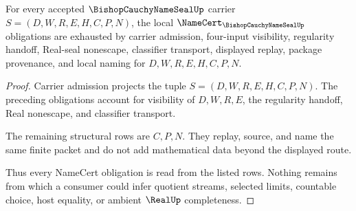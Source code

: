 \begin{theorem}
\label{thm:bishop-cauchy-name-seal-provenance-exhaustion}
For every accepted $\BishopCauchyNameSealUp$ carrier $S=(D,W,R,E,H,C,P,N)$, the local $\NameCert_{\BishopCauchyNameSealUp}$ obligations are exhausted by carrier admission, four-input visibility, regularity handoff, Real-seal nonescape, classifier transport, displayed replay, package provenance, and local naming for $D,W,R,E,H,C,P,N$.
\end{theorem}
\begin{proof}
Carrier admission projects the tuple $S=(D,W,R,E,H,C,P,N)$. The preceding obligations account for visibility of $D,W,R,E$, the regularity handoff, Real nonescape, and classifier transport.

The remaining structural rows are $C,P,N$. They replay, source, and name the same finite packet and do not add mathematical data beyond the displayed route.

Thus every NameCert obligation is read from the listed rows. Nothing remains from which a consumer could infer quotient streams, selected limits, countable choice, host equality, or ambient $\RealUp$ completeness.
\end{proof}




